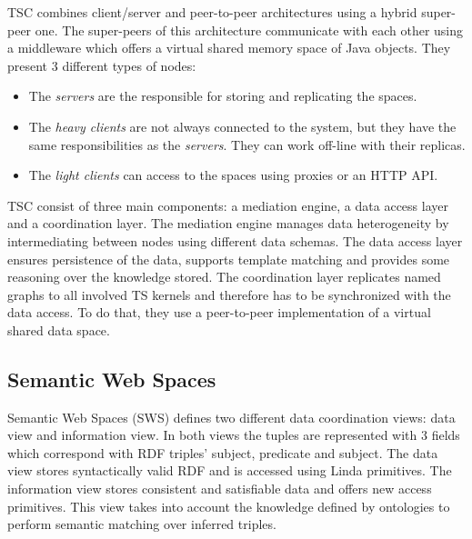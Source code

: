 TSC combines client/server and peer-to-peer architectures using a hybrid super-peer one.
The super-peers of this architecture communicate with each other using a middleware which offers a virtual shared memory space of Java objects.
They present 3 different types of nodes:
\begin{itemize}
  \item The \emph{servers} are the responsible for storing and replicating the spaces.
  \item The \emph{heavy clients} are not always connected to the system, but they have the same responsibilities as the \emph{servers}.
	They can work off-line with their replicas.
  \item The \emph{light clients} can access to the spaces using proxies or an HTTP API.
\end{itemize}


TSC consist of three main components: a mediation engine, a data access layer and a coordination layer.
The mediation engine manages data heterogeneity by intermediating between nodes using different data schemas.
The data access layer ensures persistence of the data, supports template matching and provides some reasoning over the knowledge stored.
The coordination layer replicates named graphs to all involved TS kernels and therefore has to be synchronized with the data access.
To do that, they use a peer-to-peer implementation of a virtual shared data space. %



\subsection{Semantic Web Spaces}

Semantic Web Spaces (SWS) defines two different data coordination views: data view and information view. %
In both views the tuples are represented with 3 fields which correspond with RDF triples' subject, predicate and subject.
The data view stores syntactically valid RDF and is accessed using Linda primitives.
The information view stores consistent and satisfiable data and offers new access primitives.
This view takes into account the knowledge defined by ontologies to perform semantic matching over inferred triples.

